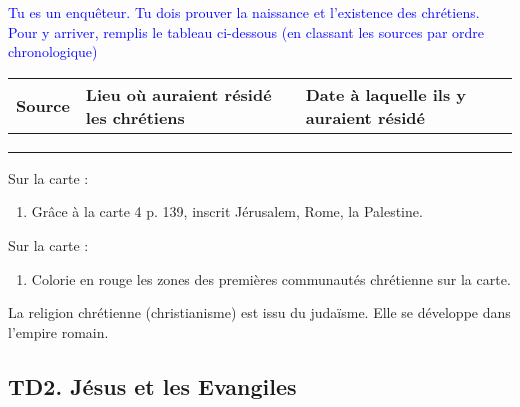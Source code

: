 \documentclass{beamer}
\begin{document}
  
  \begin{frame}
 \textcolor{blue}{Tu es un enquêteur. Tu dois prouver la naissance et l'existence des chrétiens. Pour y arriver, remplis le tableau ci-dessous (en classant les sources par ordre chronologique)}
 
 \begin{tabular}{|p{3cm}|p{3cm}|p{3cm}|}
 \hline Source & Lieu où auraient résidé les chrétiens & Date à laquelle ils y auraient résidé \\ 
 \hline \vspace{3cm} &  &  \\ 
 \hline \vspace{3cm} &  &  \\ 
 \hline \vspace{3cm} &  &  \\ 
 \hline 
 \end{tabular} 
  \end{frame}
  
  \begin{frame} Sur la carte : 
  \begin{enumerate}
  \item Grâce à la carte 4 p. 139, inscrit Jérusalem, Rome, la Palestine.
  \end{enumerate}
  
  
  \end{frame}
  
  \begin{frame} Sur la carte : 
   \begin{enumerate}
   \item Colorie en rouge les zones des premières communautés chrétienne sur la carte.
   \end{enumerate}
   
   
   \end{frame}
 
 \begin{frame}
 La religion chrétienne (christianisme) est issu du judaïsme. Elle se développe dans l'empire romain.
 \end{frame}
 
 
 \subsection{TD2. Jésus et les Evangiles}
 
\end{document}
